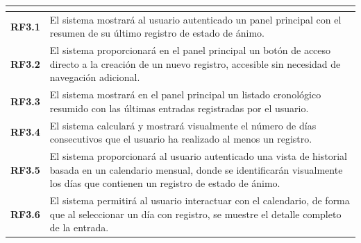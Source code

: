 \begin{xltabular}{\textwidth}{|>{\bfseries}c|X|}
     \\ \hline
    RF3.1 & El sistema mostrará al usuario autenticado un panel principal con el resumen de su último registro de estado de ánimo. \\ \hline
    RF3.2 & El sistema proporcionará en el panel principal un botón de acceso directo a la creación de un nuevo registro, accesible sin necesidad de navegación adicional. \\ \hline
    RF3.3 & El sistema mostrará en el panel principal un listado cronológico resumido con las últimas entradas registradas por el usuario. \\ \hline
    RF3.4 & El sistema calculará y mostrará visualmente el número de días consecutivos que el usuario ha realizado al menos un registro. \\ \hline
    RF3.5 & El sistema proporcionará al usuario autenticado una vista de historial basada en un calendario mensual, donde se identificarán visualmente los días que contienen un registro de estado de ánimo. \\ \hline
    RF3.6 & El sistema permitirá al usuario interactuar con el calendario, de forma que al seleccionar un día con registro, se muestre el detalle completo de la entrada. \\ \hline


\end{xltabular}
